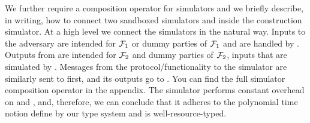 We further require a composition operator for simulators and we briefly describe, in writing, how to connect two sandboxed simulators \SIM{\rho} and \SIM{\pi} inside the construction simulator.
At a high level we connect the simulators in the natural way.
Inputs to the adversary are intended for $\mathcal{F}_1$ or dummy parties of $\mathcal{F}_1$ and are handled by \SIM{\pi}. Outputs from \SIM{\pi} are intended for $\mathcal{F}_2$ and dummy parties of $\mathcal{F}_2$, inputs that are simulated by \SIM{\rho}.
Messages from the protocol/functionality to the simulator are similarly sent to \SIM{\rho} first, and its outputs go to \SIM{\pi}.
You can find the full simulator composition operator in the appendix.
The simulator performs constant overhead on \SIM{\pi} and \SIM{\rho}, and, therefore, we can conclude that it adheres to the polynomial time notion define by our type system and is well-resource-typed.

